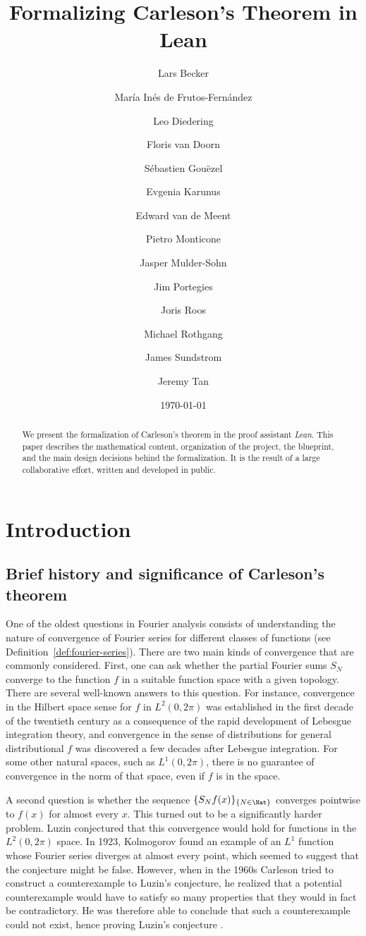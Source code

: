 \documentclass[12pt]{amsart}
\title{\textbf{Formalizing Carleson's Theorem in Lean}}
\author[Becker et al.]{Lars Becker}
\author[]{Mar\'ia Inés de Frutos-Fernández}
\author[]{Leo Diedering}
\author[]{Floris van Doorn}
\author[]{Sébastien Gouëzel}
\author[]{Evgenia Karunus}
\author[]{Edward van de Meent}
\author[]{Pietro Monticone}
\author[]{Jasper Mulder-Sohn}
\author[]{Jim Portegies}
\author[]{Joris Roos}
\author[]{Michael Rothgang}
\author[]{James Sundstrom}
\author[]{Jeremy Tan}
\date{\today}
\theoremstyle{definition}
\theoremstyle{plain}
\begin{document}
\begin{abstract}
We present the formalization of Carleson's theorem in the proof assistant \emph{Lean}.
This paper describes the mathematical content, organization of the project, the blueprint,
and the main design decisions behind the formalization. It is the result of a large
collaborative effort, written and developed in public.
\end{abstract}

\maketitle

\tableofcontents

\section{Introduction}\label{sec:intro}

\subsection{Brief history and significance of Carleson's theorem}\label{subsec:history}

One of the oldest questions in Fourier analysis consists of understanding the nature of convergence of Fourier series for different classes of functions (see Definition~\ref{def:fourier-series}).
There are two main kinds of convergence that are commonly considered. First, one can ask whether the partial Fourier sums $S_N$ converge to the function $f$ in a suitable function
space with a given topology. There are several well-known answers to this question. For instance, convergence in the Hilbert
space sense for $f$ in $L^2(0,2\pi)$ was established in the first decade of
the twentieth century as a consequence of the rapid development of Lebesgue
integration theory, and convergence in the sense of
distributions for general distributional $f$ was discovered a few decades
after Lebesgue integration. For some other natural spaces, such as
$L^1(0,2\pi)$, there is no guarantee of convergence in the norm of that space,
even if $f$ is in the space.

A second question is whether the sequence $\{ S_N f (x)\}_{\{ N \in\Nat\}}$ converges pointwise to $f(x)$ for almost every $x$. This turned out to be a significantly harder problem.
Luzin \cite{Luzin13} conjectured that this convergence would hold for functions in the
$L^2(0,2\pi)$ space. In 1923, Kolmogorov found an example \cite{Kolmogorov} of an $L^1$ function whose Fourier series diverges at almost every point, which seemed to suggest that the conjecture might be false. However, when in the 1960s Carleson tried to construct a counterexample to Luzin's conjecture, he realized that a potential counterexample would have to satisfy so many properties that they would in fact be contradictory. He was therefore able to conclude that such a counterexample could not exist, hence proving Luzin's conjecture \cite{carleson}.
\end{document}
